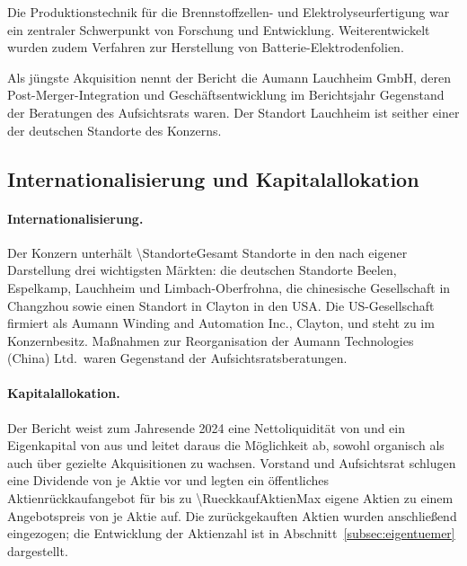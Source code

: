 Die Produktionstechnik f\"ur die Brennstoffzellen- und Elektrolyseurfertigung
war ein zentraler Schwerpunkt von Forschung und
Entwicklung. Weiterentwickelt wurden zudem Verfahren zur
Herstellung von Batterie-Elektrodenfolien.

Als j\"ungste Akquisition nennt der Bericht die Aumann Lauchheim GmbH, deren
Post-Merger-Integration und Gesch\"aftsentwicklung im Berichtsjahr Gegenstand
der Beratungen des Aufsichtsrats waren. Der Standort
Lauchheim ist seither einer der deutschen Standorte des
Konzerns.

\subsection{Internationalisierung und Kapitalallokation}
\label{subsec:international}

\paragraph{Internationalisierung.}
Der Konzern unterh\"alt \num{\StandorteGesamt} Standorte in den nach eigener
Darstellung drei wichtigsten M\"arkten: die deutschen Standorte Beelen,
Espelkamp, Lauchheim und Limbach-Oberfrohna, die chinesische Gesellschaft in
Changzhou sowie einen Standort in Clayton in den
USA. Die US-Gesellschaft firmiert als Aumann Winding and
Automation Inc., Clayton, und steht zu \Pct{\AnteilUSGesellschaft} im Konzernbesitz.
Ma{\ss}nahmen zur Reorganisation der Aumann Technologies (China) Ltd.\ waren
Gegenstand der Aufsichtsratsberatungen.

\paragraph{Kapitalallokation.}
Der Bericht weist zum Jahresende 2024 eine Nettoliquidit\"at von
\MioEUR{\NettoliquiditaetZFIV} und ein Eigenkapital von
\MioEUR{\EigenkapitalZFIV} aus und leitet daraus die M\"oglichkeit ab, sowohl
organisch als auch \"uber gezielte Akquisitionen zu
wachsen. Vorstand und Aufsichtsrat schlugen eine Dividende
von \EURje{\DividendeJeAktieZFIV} je Aktie vor und legten ein \"offentliches
Aktienr\"uckkaufangebot f\"ur bis zu \num{\RueckkaufAktienMax} eigene Aktien
zu einem Angebotspreis von \EURje{\RueckkaufPreis} je Aktie
auf. Die zur\"uckgekauften Aktien wurden anschlie{\ss}end
eingezogen; die Entwicklung der Aktienzahl ist in
Abschnitt~\ref{subsec:eigentuemer} dargestellt.

